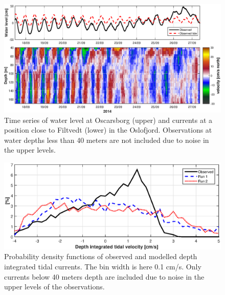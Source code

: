 \begin{figure}[!t]
\centering
\includegraphics[width=\textwidth]{fig_Filtvedt_timeseries}
\caption{Time series of water level at Oscarsborg (upper) and currents at a position close to Filtvedt (lower) in the Oslofjord. Observations at water depths less than 40 meters are not included due to noise in the upper levels.}
\label{fig:Filtvedt_timeseries}
\end{figure}

\begin{figure}[!t]
\centering
\includegraphics[width=\textwidth]{fig_Filtvedt_pdf}
\caption{Probability density functions of observed and modelled depth integrated tidal currents. The bin width is here 0.1 cm/s. Only currents below 40 meters depth are included due to noise in the upper levels of the observations.}
\label{fig:Filtvedt_pdf}
\end{figure}


